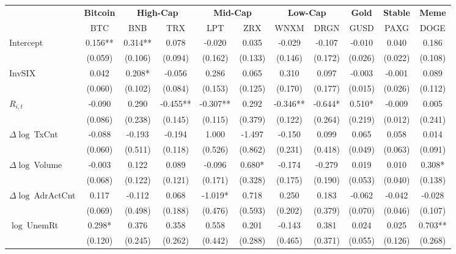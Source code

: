 \begin{table}[ht]
\centering
\scriptsize
\setlength{\tabcolsep}{4pt}
\begin{tabular}{l *{10}{c}}
\toprule
&\multicolumn{1}{c}{\textbf{Bitcoin}}&\multicolumn{2}{c}{\textbf{High-Cap}}&\multicolumn{2}{c}{\textbf{Mid-Cap}}&\multicolumn{2}{c}{\textbf{Low-Cap}}&\multicolumn{1}{c}{\textbf{Gold}}&\multicolumn{1}{c}{\textbf{Stable}}&\multicolumn{1}{c}{\textbf{Meme}}\\
\addlinespace
 & BTC & BNB & TRX & LPT & ZRX & WNXM & DRGN & GUSD & PAXG & DOGE \\
\midrule
Intercept & 0.156** & 0.314** & 0.078 & -0.020 & 0.035 & -0.029 & -0.107 & -0.010 & 0.040 & 0.186 \\
 & (0.059) & (0.106) & (0.094) & (0.162) & (0.133) & (0.146) & (0.172) & (0.026) & (0.022) & (0.108) \\
\addlinespace
InvSIX & 0.042 & 0.208* & -0.056 & 0.286 & 0.065 & 0.310 & 0.097 & -0.003 & -0.001 & 0.089 \\
 & (0.060) & (0.102) & (0.084) & (0.153) & (0.125) & (0.170) & (0.177) & (0.015) & (0.026) & (0.112) \\
\addlinespace
$R_{i,t}$ & -0.090 & 0.290 & -0.455** & -0.307** & 0.292 & -0.346** & -0.644* & 0.510* & -0.009 & 0.005 \\
 & (0.086) & (0.238) & (0.145) & (0.115) & (0.379) & (0.122) & (0.264) & (0.219) & (0.012) & (0.241) \\
\addlinespace
$\Delta\log\ $TxCnt & -0.088 & -0.193 & -0.194 & 1.000 & -1.497 & -0.150 & 0.099 & 0.065 & 0.058 & 0.014 \\
 & (0.060) & (0.511) & (0.118) & (0.526) & (0.862) & (0.231) & (0.418) & (0.049) & (0.063) & (0.091) \\
\addlinespace
$\Delta\log\ $Volume & -0.003 & 0.122 & 0.089 & -0.096 & 0.680* & -0.174 & -0.279 & 0.019 & 0.010 & 0.308* \\
 & (0.068) & (0.122) & (0.121) & (0.171) & (0.328) & (0.175) & (0.190) & (0.053) & (0.040) & (0.138) \\
\addlinespace
$\Delta\log\ $AdrActCnt & 0.117 & -0.112 & 0.068 & -1.019* & 0.718 & 0.250 & 0.183 & -0.062 & -0.042 & -0.028 \\
 & (0.069) & (0.498) & (0.188) & (0.476) & (0.593) & (0.202) & (0.379) & (0.070) & (0.046) & (0.107) \\
\addlinespace
$\log\ $UnemRt & 0.298* & 0.376 & 0.358 & 0.558 & 0.201 & -0.143 & 0.381 & 0.024 & 0.025 & 0.703** \\
 & (0.120) & (0.245) & (0.262) & (0.442) & (0.288) & (0.465) & (0.371) & (0.055) & (0.126) & (0.268) \\

\end{tabular}
\end{table}
